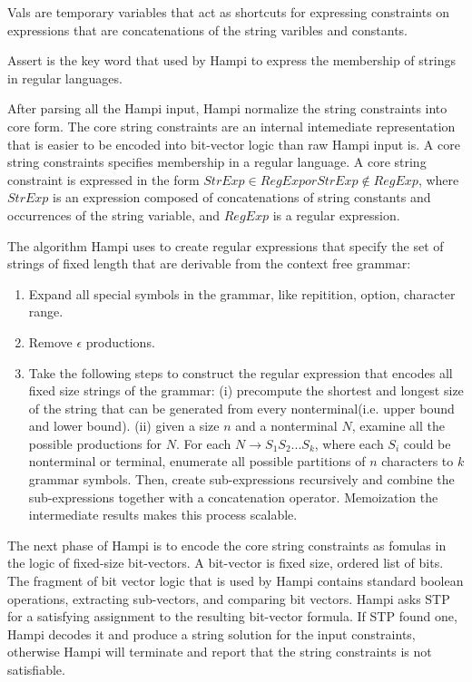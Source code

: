 Vals are temporary variables that act as shortcuts for expressing constraints on expressions that are concatenations of the string varibles and constants.

Assert is the key word that used by Hampi to express the membership of strings in regular languages.

After parsing all the Hampi input, Hampi normalize the string constraints into core form. The core string constraints are an internal intemediate representation that is easier to be encoded into bit-vector logic than raw Hampi input is. A core string constraints specifies membership in a regular language. A core string constraint is expressed in the form $StrExp\in RegExp or StrExp\notin RegExp$, where $StrExp$ is an expression composed of concatenations of string constants and occurrences of the string variable, and $RegExp$ is a regular expression.

The algorithm Hampi uses to create regular expressions that specify the set of strings of fixed length that are derivable from the context free grammar:
\begin{enumerate}
	\item Expand all special symbols in the grammar, like repitition, option, character range.
	\item Remove $\epsilon$ productions.
	\item Take the following steps to construct the regular expression that encodes all fixed size strings of the grammar: (i) precompute the shortest and longest size of the string that can be generated from every nonterminal(i.e. upper bound and lower bound). (ii) given a size $n$ and a nonterminal $N$, examine all the possible productions for $N$. For each $N\rightarrow S_1S_2...S_k$, where each $S_i$ could be nonterminal or terminal, enumerate all possible partitions of $n$ characters to $k$ grammar symbols. Then, create sub-expressions recursively and combine the sub-expressions together with a concatenation operator. Memoization the intermediate results makes this process scalable. 
\end{enumerate}   
The next phase of Hampi is to encode the core string constraints as fomulas in the logic of fixed-size bit-vectors. A bit-vector is fixed size, ordered list of bits. The fragment of bit vector logic that is used by Hampi contains standard boolean operations, extracting sub-vectors, and comparing bit vectors. Hampi asks STP for a satisfying assignment to the resulting bit-vector formula. If STP found one, Hampi decodes it and produce a string solution for the input constraints, otherwise Hampi will terminate and report that the string constraints is not satisfiable.